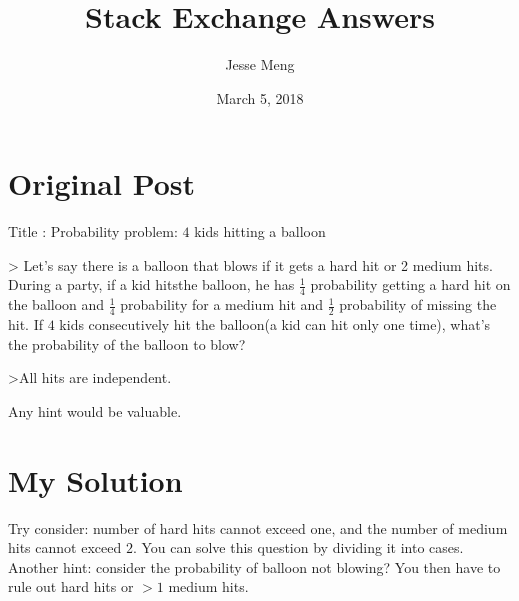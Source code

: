 \documentclass{article}
\title{Stack Exchange Answers}
\author{Jesse Meng }
\date{March 5, 2018}
\begin{document}
\maketitle

\section{Original Post}
Title : Probability problem: $4$ kids hitting a balloon

> Let's say there is a balloon that blows if it gets a hard hit or 2 medium hits. During a party, if a kid  hitsthe balloon, he has $\frac{1}{4}$ probability getting a hard hit on the balloon and $\frac{1}{4}$ probability for a medium hit and $\frac{1}{2}$ probability of missing the hit. If $4$ kids consecutively hit the balloon(a kid can hit only one time), what's the probability of the balloon to blow?

>All hits are independent.

Any hint would be valuable.
\section{My Solution}
Try consider: number of hard hits cannot exceed one, and the number of medium hits cannot exceed $2$. You can solve this question by dividing it into cases.
Another hint: consider the probability of balloon not blowing? You then have to rule out hard hits or $>1$ medium hits.
\end{document}
